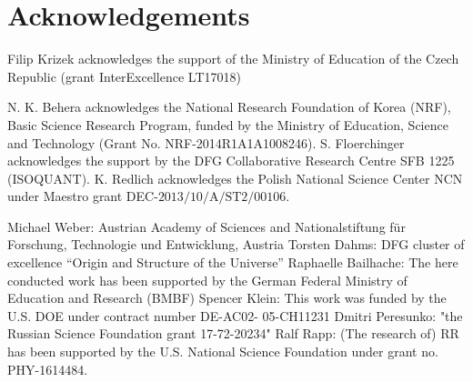 \section*{Acknowledgements}


Filip Krizek acknowledges the support of the Ministry of Education of the Czech Republic (grant InterExcellence LT17018)

N. K. Behera acknowledges the National Research Foundation of Korea (NRF), Basic Science Research Program, funded by the Ministry of Education, Science and Technology (Grant No. NRF-2014R1A1A1008246).
S. Floerchinger acknowledges the support by the DFG Collaborative Research Centre SFB 1225 (ISOQUANT). 
K. Redlich acknowledges the Polish National Science Center NCN under Maestro grant DEC-$\mathrm{2013/10/A/ST2/00106}$. 

Michael Weber: Austrian Academy of Sciences and Nationalstiftung f\"ur Forschung, Technologie und Entwicklung, Austria
Torsten Dahms: DFG cluster of excellence ``Origin and Structure of the Universe'' 
Raphaelle Bailhache: The here conducted work has been supported by the German Federal Ministry of Education and Research (BMBF)
Spencer Klein: This work was funded by the U.S. DOE under contract number DE-AC02- 05-CH11231
Dmitri Peresunko: "the Russian Science Foundation grant 17-72-20234"
Ralf Rapp: (The research of) RR has been supported by the U.S. National Science Foundation under
grant no. PHY-1614484.
